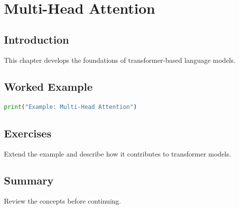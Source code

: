 \chapter{Multi-Head Attention}
\label{chap:vol8-13}
\section{Introduction}
This chapter develops the foundations of transformer-based language models.

\section{Worked Example}
\begin{lstlisting}[language=Python]
print("Example: Multi-Head Attention")
\end{lstlisting}

\section{Exercises}
\begin{exercise}
Extend the example and describe how it contributes to transformer models.
\end{exercise}

\section{Summary}
Review the concepts before continuing.
